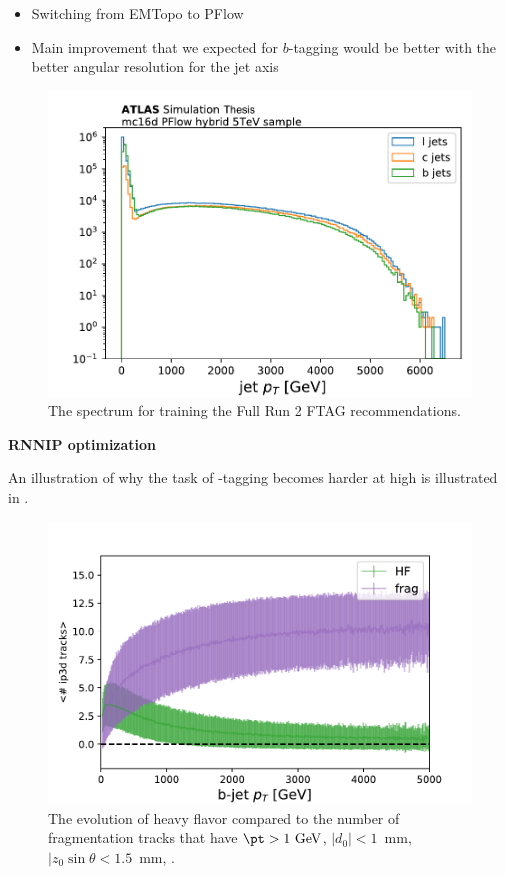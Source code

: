 \begin{itemize}
	\item Switching from EMTopo to PFlow
	\item Main improvement that we expected for $b$-tagging would be better with the better angular resolution for the jet axis
\end{itemize}

\begin{figure}[htbp]
  \centering
  \includegraphics[width=.6\textwidth]{figures/ftag/PFlow trainings/pflow-pt-extended-hybrid}
  \caption{The \pt spectrum for training the Full Run 2 FTAG recommendations.}
  \label{fig:pflow-pt-extended-hybrid}
\end{figure}



\textbf{RNNIP optimization}

An illustration of why the task of \Pqb-tagging becomes harder at high \pt is illustrated in \Fig{\ref{fig:hf-ftag-tracks}}.


\begin{figure}[htbp]
  \centering
  \includegraphics[width=.6\textwidth]{figures/ftag/PFlow trainings/hf-frag-tracks}
  \caption{The evolution of heavy flavor compared to the number of fragmentation tracks that have $\pt > 1~\mathrm{GeV}$, $|d_0| < 1$~mm, $|z_0 \sin \theta < 1.5$~mm, .}
  \label{fig:hf-frag-tracks}
\end{figure}


